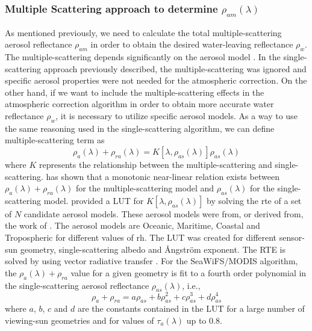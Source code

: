 \subsubsection{Multiple Scattering approach to determine \texorpdfstring{$\rho_{am}(\lambda)$}{aerosol contribution}}
As mentioned  previously, we need to calculate the total multiple-scattering aerosol reflectance $\rho_{am}$ in order to obtain the desired water-leaving reflectance $\rho_w$. The multiple-scattering depends significantly on the aerosol model \citep{Gordon:1997}. In the single-scattering approach previously described, the multiple-scattering was ignored and specific aerosol properties were not needed for the atmospheric correction. On the other hand, if we want to include the multiple-scattering effects in the atmospheric correction algorithm in order to obtain more accurate water reflectance $\rho_w$, it is necessary to utilize specific aerosol models. As a way to use the same reasoning used in the single-scattering algorithm, we can define multiple-scattering term as
\begin{equation}\label{eq:multscat}
  \rho_a(\lambda) + \rho_{ra}(\lambda) = K[\lambda,\rho_{as}(\lambda)]\rho_{as}(\lambda)
\end{equation}
where $K$ represents the relationship between the multiple-scattering and single-scattering. \citet{Wang:1991} has shown that a monotonic near-linear relation exists between $\rho_a(\lambda)+\rho_{ra}(\lambda)$ for the multiple-scattering model and $\rho_{as}(\lambda)$ for the single-scattering model. \citet{Gordon:1994} provided a LUT for $K[\lambda,\rho_{as}(\lambda)]$ by solving the \gls{rte} of a set of $N$ candidate aerosol models. These aerosol models were from, or derived from, the work of \citet{Shettle:1979}. The aerosol models are Oceanic, Maritime, Coastal and Tropospheric for different values of \gls{rh}. The LUT was created for different sensor-sun geometry, single-scattering albedo and \AA ngstr\"{o}m exponent. The RTE is solved by using vector radiative transfer \citep{IOCCG:2010}. For the SeaWiFS/MODIS algorithm, the $\rho_a(\lambda)+\rho_{ra}$ value for a given geometry is fit to a fourth order polynomial in the single-scattering aerosol reflectance $\rho_{as}(\lambda)$, i.e.,
\begin{equation}\label{eq:polynomial}
  \rho_a+\rho_{ra} = a\rho_{as}+b\rho_{as}^2+c\rho_{as}^3+d\rho_{as}^4
\end{equation}
where $a$, $b$, $c$ and $d$ are the constants contained in the LUT for a large number of viewing-sun geometries and for values of $\tau_a(\lambda)$ up to $0.8$.


